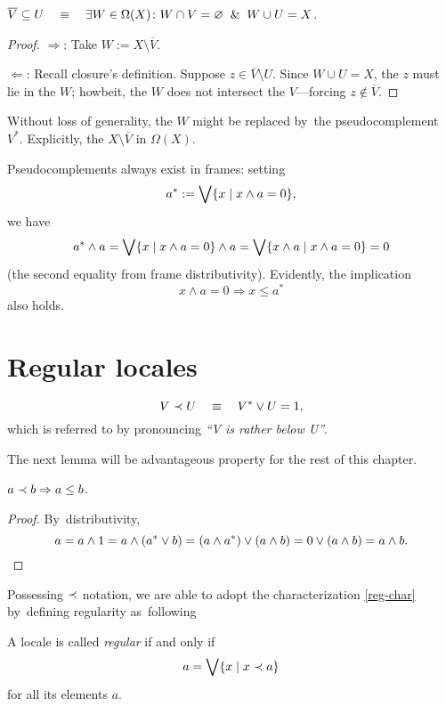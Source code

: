 \begin{lem}
  $\overline{V}\subseteq U \quad \equiv \quad \exists W\in \Omega(X)\colon W \cap V =
  \varnothing \;\; \& \;\; W \cup U = X$.
\end{lem}
\begin{proof}
  $\Rightarrow$:
  Take $W := X\setminus \overline{V}$.

  $\Leftarrow$:
  Recall closure's definition.
  Suppose $z\in \overline{V}\setminus U$.
  Since $W \cup U = X$, the $z$ must lie in the $W$;
  howbeit, the $W$ does not intersect the $V$---forcing $z\not\in
  \overline{V}$.
\end{proof}

Without loss of generality, the $W$ might be replaced by~the
pseudocomplement~$V^*$.
Explicitly, the $X\setminus \overline{V}$ in $\Omega(X)$.%

\begin{note}
Pseudocomplements always exist in frames:
setting
\[
  a^* := \bigvee \{x \mid x \wedge a = 0\},
\]
we have
\[
  a^* \wedge a = \bigvee \{x \mid x \wedge a = 0\} \wedge a = \bigvee \{x \wedge
  a \mid x \wedge a = 0\} = 0
\]
(the second equality from frame distributivity).
Evidently, the implication
\[
  x \wedge a = 0 \Rightarrow x \le a^*
\]
also holds.
\end{note}

\section{Regular locales}

\begin{framed}
  \begin{nota}[$\rb$]
    \[
      V \prec U \quad \equiv \quad V^* \vee U = 1,
    \]
    which is referred to by pronouncing \emph{``V is rather below U''\/}.
  \end{nota}
\end{framed}

The next lemma will be advantageous property for the rest of this chapter.
\begin{lem} \label{rb->leq}
  $a \prec b \Rightarrow a \leq b$.
\end{lem}
\begin{proof}
  By~distributivity,
  \[
    a = a \wedge 1 = a \wedge (a^* \vee b) = (a \wedge a^*) \vee (a \wedge b) =
    0 \vee (a \wedge b) = a \wedge b. \qedhere
  \]
\end{proof}

Possessing $\rb$ notation, we are able to adopt the characterization
\ref{reg-char} by~defining regularity as~following
\begin{framed}
  \begin{df}[Reg]
    A locale is called \emph{regular\/} if and only if
    \[
      a = \bigvee \{x \mid x \prec a\}
    \]
    for all its elements $a$.
  \end{df}
\end{framed}

